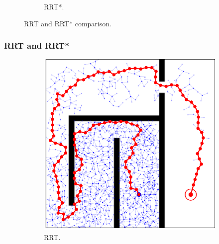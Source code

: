 \documentclass{beamer}
\begin{document}
\begin{frame}
\begin{figure}[!ht]
\begin{subfigure}[b]{0.45\textwidth}
			\caption{RRT*.}
			\label{fig:rrtstar2k}
		\end{subfigure}    
		\caption{RRT and RRT* comparison.}
		\label{fig:RRTvsRRTstar}
	  \end{figure}
\end{frame}		

\begin{frame}
	\frametitle{RRT and RRT*}	
	\begin{figure}[!ht]
		\centering 
		\begin{subfigure}[b]{0.45\textwidth}
			\includegraphics[width=\textwidth]{figChap3/RRT_maze7748i119w.pdf}
			\caption{RRT.} 
		\end{subfigure}
		~ %
		\begin{subfigure}[b]{0.45\textwidth}

\end{subfigure}
\end{figure}
\end{frame}
\end{document}
